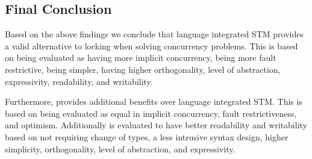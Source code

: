 \subsection{Final Conclusion}
Based on the above findings we conclude that language integrated \ac{STM} provides a valid alternative to locking when solving concurrency problems. This is based on being evaluated as having more implicit concurrency, being more fault restrictive, being simpler, having higher orthogonality, level of abstraction, expressivity, readability, and writability.

Furthermore, \stmname provides additional benefits over language integrated \ac{STM}. This is based on being evaluated as equal in implicit concurrency, fault restrictiveness, and optimism. Additionally \stmname is evaluated to have better readability and writability based on not requiring change of types, a less intrusive syntax design, higher simplicity, orthogonality, level of abstraction, and expressivity.

\worksheetend